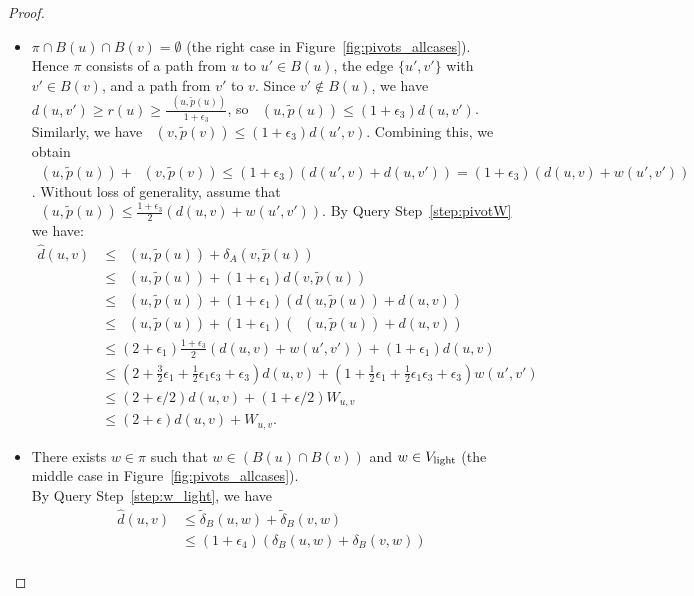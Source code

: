 \documentclass[11pt]{article}
\theoremstyle{definition}
\theoremstyle{remark}
\DeclareMathOperator{\dLNbunch}{\delta_{\tilde{B}}}
\begin{document}
\begin{titlepage}
\begin{proof}
    \begin{itemize}
        \item[Case 2:] $\pi\cap B(u)\cap B(v) =\emptyset$ (the right case in Figure~\ref{fig:pivots_allcases}).\\
        Hence $\pi$ consists of a path from $u$ to $u'\in B(u)$, the edge $\{u',v'\}$ with $v'\in B(v)$, and a path from $v'$ to $v$.
        Since $v'\notin B(u)$, we have $d(u,v')\geq   r(u) \geq \tfrac{\dLNbunch(u,\tilde p(u))}{1+\epsilon_3}$, so $\dLNbunch(u,\tilde p(u))\leq (1+\epsilon_3)d(u,v')$. Similarly, we have $\dLNbunch(v,\tilde p(v))\leq (1+\epsilon_3)d(u',v)$. Combining this, we obtain $\dLNbunch(u,\tilde p(u))+ \dLNbunch(v,\tilde p(v))\leq (1+\epsilon_3)(d(u',v)+d(u,v')) = (1+\epsilon_3)(d(u,v)+w(u',v'))$. Without loss of generality, assume that $\dLNbunch(u,\tilde p(u))\leq  \tfrac{1+\epsilon_3}{2}(d(u,v)+w(u',v'))$.  By Query Step~\ref{step:pivotW} we have:
        \begin{align*} 
            \hat{d}(u,v) &\leq \dLNbunch(u,\tilde p(u))+\delta_A(v,\tilde p(u)) \\
            &\leq \dLNbunch(u,\tilde p(u)) +(1+\epsilon_1)d(v,\tilde p(u))\\
            &\leq \dLNbunch(u,\tilde p(u))+(1+\epsilon_1)(d(u,\tilde p(u))+d(u,v))\\
            &\leq \dLNbunch(u,\tilde p(u))+(1+\epsilon_1)(\dLNbunch(u,\tilde p(u))+d(u,v))\\
            &\leq  (2+\epsilon_1)\tfrac{1+\epsilon_3}{2}(d(u,v)+w(u',v'))+(1+\epsilon_1)d(u,v)\\
            &\leq (2+\tfrac{3}{2}\epsilon_1+\tfrac{1}{2}\epsilon_1\epsilon_3+\epsilon_3)d(u,v)+(1+\tfrac{1}{2}\epsilon_1+\tfrac{1}{2}\epsilon_1\epsilon_3+\epsilon_3)w(u',v') \\
            &\leq (2+\epsilon/2)d(u,v)+(1+\epsilon/2)W_{u,v}\\
            &\leq (2+\epsilon)d(u,v)+W_{u,v}.
        \end{align*}
        \item[Case 3:] 
            There exists $w\in \pi$ such that $w\in (B(u)\cap B(v))$ and $w\in V_{\rm{light}}$ (the middle case in Figure~\ref{fig:pivots_allcases}).\\
            By Query Step~\ref{step:w_light}, we have 
            \begin{align*}
                \hat d(u,v) &\leq \tilde\delta_B(u,w)+\tilde\delta_B(v,w)\\
                &\leq (1+\epsilon_4)(\delta_B(u,w)+\delta_B(v,w))\\

\end{align*}
\end{itemize}
\end{proof}
\end{titlepage}
\end{document}
